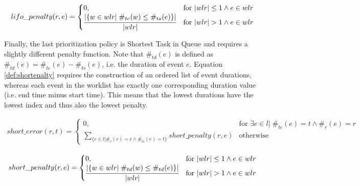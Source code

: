 \begin{equation}\label{def:lifo_penalty}
  \begin{array}{l}
    lifo\_penalty(r, e) = 
    
    \begin{cases}
    	0, & \text{for } |wlr| \leq 1 \wedge e \in wlr  \\
        \cfrac{|\{w \in wlr|\; \#_{te}(w)  \leq \#_{ts}(e)\}|}{|wlr|}  & \text{for } |wlr| > 1 \wedge e \in wlr
    \end{cases}
  \end{array}
\end{equation}

Finally, the last prioritization policy is Shortest Task in Queue and requires a slightly different penalty function. Note that $\#_{td}(e)$ is defined as $\#_{td}(e)=\#_{te}(e)-\#_{ts}(e)$, i.e. the duration of event $e$. Equation \ref{def:shortenalty} requires the construction of an ordered list of event durations, whereas each event in the worklist has exactly one corresponding duration value (i.e. end time minus start time). This means that the lowest durations have the lowest index and thus also the lowest penalty. 

\begin{equation}\label{def:short}
  \begin{array}{l}
    short\_error(r, t) = 
    
    \begin{cases}
    	0, & \text{for } \exists{e \in l} | \; \#_{te}(e) = t \wedge \#_{r}(e)=r \\
        \sum_{\{e \in l | \#_{r}(e)=r \wedge \#_{te}(e)=t\}} short\_penalty(r,e)  & \text{otherwise}
    \end{cases}
  \end{array}
\end{equation}

\begin{equation}\label{def:shortenalty}
  \begin{array}{l}
    short\_penalty(r, e) = 
    
    \begin{cases}
    	0, & \text{for } |wlr| \leq 1 \wedge e \in wlr  \\
        
        \cfrac{|\{w \in wlr|\; \#_{td}(w) \leq \#_{td}(e)\}|}{|wlr|}  & \text{for } |wlr|> 1 \wedge e \in wlr\\
    \end{cases}
  \end{array}
\end{equation}

